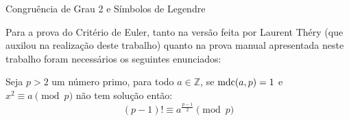 \begin{frame}[fragile]{Congruência de Grau 2 e Símbolos de Legendre}

    Para a prova do Critério de Euler, tanto na versão feita por Laurent Théry (que auxilou na realização deste trabalho) quanto na prova manual apresentada neste trabalho foram necessários os seguintes enunciados: 

    \begin{lema} \label{lema : modp-1fat}
    Seja $p > 2$ um número primo, para todo $a \in \mathbb{Z}$, se $\operatorname{mdc}(a, p) = 1$ e $x^2 \equiv a \pmod p$ não tem solução então:
        \begin{equation*}
            (p - 1)! \equiv a^{\frac{p-1}{2}} \pmod{p}
        \end{equation*}
    \end{lema}

        

\end{frame}


